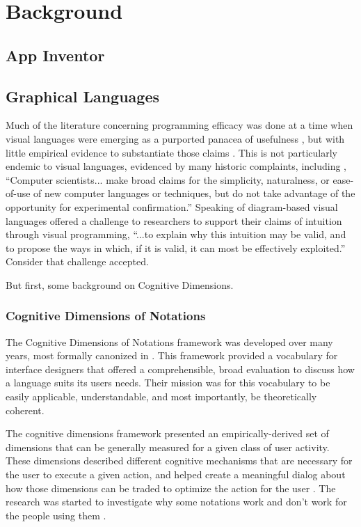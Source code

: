 \chapter{Background}
\label{chap:background}

\section{App Inventor}
\label{sec:app-inventor-background}

\section{Graphical Languages}
\label{sec:graphical-languages}

Much of the literature concerning programming efficacy was done at a time when visual languages were emerging as a purported panacea of usefulness \citep{shu-1988}, but with little empirical evidence to substantiate those claims \citep{petre-1995}. This is not particularly endemic to visual languages, evidenced by many historic complaints, including \citet{sch-1980}, ``Computer scientists... make broad claims for the simplicity, naturalness, or ease-of-use of new computer languages or techniques, but do not take advantage of the opportunity for experimental confirmation.'' Speaking of diagram-based visual languages \citet{blackwell-2001} offered a challenge to researchers to support their claims of intuition through visual programming, ``...to explain why this intuition may be valid, and to propose the ways in which, if it is valid, it can most be effectively exploited.'' Consider that challenge accepted.

But first, some background on Cognitive Dimensions.

\subsection{Cognitive Dimensions of Notations}
The Cognitive Dimensions of Notations framework was developed over many years, most formally canonized in \citet{blackwell-2003}. This framework provided a vocabulary for interface designers that offered a comprehensible, broad evaluation to discuss how a language suits its users needs. Their mission was for this vocabulary to be easily applicable, understandable, and most importantly, be theoretically coherent. 

The cognitive dimensions framework presented an empirically-derived set of dimensions that can be generally measured for a given class of user activity. These dimensions described different cognitive mechanisms that are necessary for the user to execute a given action, and helped create a meaningful dialog about how those dimensions can be traded to optimize the action for the user \citep{blackwell-2003}. The research was started to investigate why some notations work and don't work for the people using them \citep{petre-2006}. 

